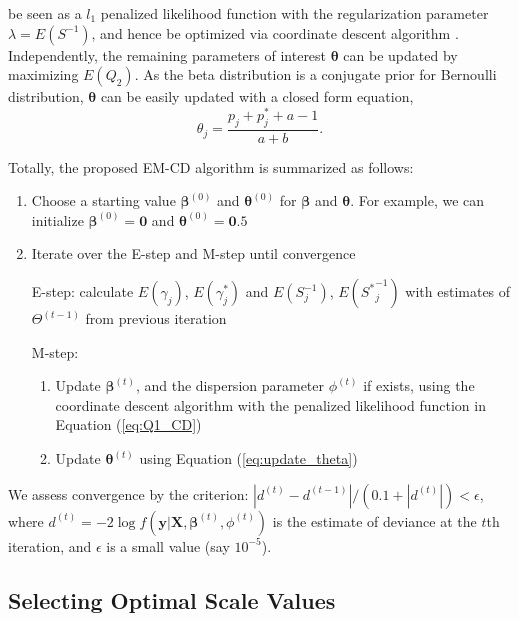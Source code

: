 \documentclass[AMA,STIX1COL,]{WileyNJD-v2}
\begin{document}
be seen as a \(l_1\) penalized likelihood function with the
regularization parameter \(\lambda = E(S^{-1})\), and hence be optimized
via coordinate descent algorithm \citep{Friedman2010}. Independently,
the remaining parameters of interest \(\boldsymbol{\theta}\) can be
updated by maximizing \(E(Q_2)\). As the beta distribution is a
conjugate prior for Bernoulli distribution, \(\boldsymbol{\theta}\) can
be easily updated with a closed form equation,
\begin{equation}\label{eq:update_theta}
\theta_j = \frac{p_j + p^*_{j} + a - 1 }{a + b}.
\end{equation}

Totally, the proposed EM-CD algorithm is summarized as follows:

\begin{enumerate}
\def\labelenumi{\arabic{enumi})}
\item
  Choose a starting value \(\boldsymbol{\beta}^{(0)}\) and
  \(\boldsymbol{\theta}^{(0)}\) for \(\boldsymbol{\beta}\) and
  \(\boldsymbol{\theta}\). For example, we can initialize
  \(\boldsymbol{\beta}^{(0)} = \boldsymbol{0}\) and
  \(\boldsymbol{\theta}^{(0)} = \boldsymbol{0}.5\)
\item
  Iterate over the E-step and M-step until convergence

  E-step: calculate \(E(\gamma_{j})\), \(E(\gamma^*_{j})\) and
  \(E({S}^{-1}_{j})\), \(E({S^*}^{-1}_{j})\) with estimates of
  \(\Theta^{(t-1)}\) from previous iteration

  M-step:

  \begin{enumerate}
  \def\labelenumii{\alph{enumii})}
  \item
    Update \(\boldsymbol{\beta}^{(t)}\), and the dispersion parameter
    \(\phi^{(t)}\) if exists, using the coordinate descent algorithm
    with the penalized likelihood function in Equation (\ref{eq:Q1_CD})
  \item
    Update \(\boldsymbol{\theta}^{(t)}\) using Equation
    (\ref{eq:update_theta})
  \end{enumerate}
\end{enumerate}

We assess convergence by the criterion:
\(|d^{(t)}-d^{(t-1)}|/(0.1+|d^{(t)}|)<\epsilon\), where
\(d^{(t)} = -2\log f(\textbf{y}| \textbf{X}, \boldsymbol{\beta}^{(t)},\phi^{(t)})\)
is the estimate of deviance at the \(t\)th iteration, and \(\epsilon\)
is a small value (say \(10^{-5}\)).

\subsection{Selecting Optimal Scale Values}
\label{sec:tune}
\end{document}
